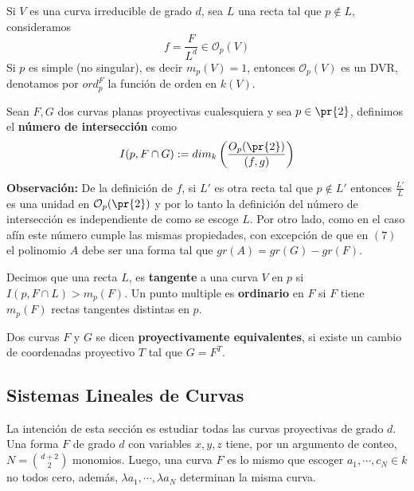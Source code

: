 \documentclass{article}
\begin{document}
\vspace{2mm}
\noindent Si $V$ es una curva irreducible de grado $d$, sea $L$ una recta tal que $p\not\in L$, 
consideramos
\begin{equation*}
    f=\frac{F}{L^{d}}\in \mathcal{O}_{p}(V)
\end{equation*}
Si $p$ es simple (no singular), es decir $m_{p}(V)=1$, entonces $\mathcal{O}_{p}(V)$ es un DVR, 
denotamos por $ord_{p}^{F}$ la función de orden en $k(V)$.
\begin{dfn}
    Sean $F,G$ dos curvas planas proyectivas cualesquiera y sea $p\in\pr{2}$, definimos el 
    \textbf{número de intersección} como
    \begin{equation*}
        I(p,F\cap G):=dim_{k}\left(\frac{O_{p}(\pr{2})}{(f,g)}\right)
    \end{equation*}
\end{dfn}
\noindent\textbf{Observación:} De la definición de $f$, si $L'$ es otra recta tal que $p\not\in L'$
entonces $\frac{L'}{L}$ es una unidad en $\mathcal{O}_{p}(\pr{2})$ y por lo tanto la definición del
número de intersección es independiente de como se escoge $L$. Por otro lado, como en el caso afín
este número cumple las mismas propiedades, con excepción de que en $(7)$ el polinomio $A$ debe ser
una forma tal que $gr(A)=gr(G)-gr(F)$.
\begin{dfn}
    Decimos que una recta $L$, es \textbf{tangente} a una curva $V$ en $p$ si $I(p,F\cap L)
    >m_{p}(F)$. Un punto multiple es \textbf{ordinario} en $F$ si $F$ tiene $m_{p}(F)$ rectas 
    tangentes distintas en $p$.
\end{dfn}
\begin{dfn}
    Dos curvas $F$ y $G$ se dicen \textbf{proyectivamente equivalentes}, si existe un cambio de 
    coordenadas proyectivo $T$ tal que $G=F^{T}$.
\end{dfn}

\subsection{Sistemas Lineales de Curvas}
\noindent La intención de esta sección es estudiar todas las curvas proyectivas de grado $d$. 
Una forma $F$ de grado $d$ con variables $x,y,z$ tiene, por un argumento de conteo, 
$N=\binom{d+2}{2}$ monomios. Luego, una curva $F$ es lo mismo que escoger $a_{1},\cdots,c_{N}\in k$
no todos cero, además, $\lambda a_{1},\cdots,\lambda a_{N}$ determinan la misma curva.
\end{document}
